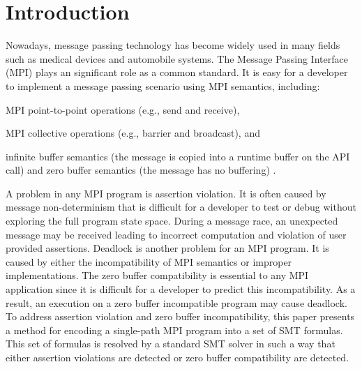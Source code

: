 \section{Introduction}
Nowadays, message passing technology has become widely used in many fields such as medical devices and automobile systems. The Message Passing Interface (MPI) plays an significant role as a common standard. It is easy for a developer to implement a message passing scenario using MPI semantics, including:

\begin{compactitem}
\item MPI point-to-point operations (e.g., send and receive),
\item MPI collective operations (e.g., barrier and broadcast), and
\item infinite buffer semantics (the message is copied into a runtime buffer on the API call) and zero buffer semantics (the message has no buffering) \cite{DBLP:conf/fm/VakkalankaVGK09}.
\end{compactitem}

A problem in any MPI program is assertion violation. It is often caused by message non-determinism that is difficult for a developer to test or debug without exploring the full program state space. During a message race, an unexpected message may be received leading to incorrect computation and violation of user provided assertions. Deadlock is another problem for an MPI program. It is caused by either the incompatibility of MPI semantics or improper implementations. The zero buffer compatibility is essential to any MPI application since it is difficult for a developer to predict this incompatibility. As a result, an execution on a zero buffer incompatible program may cause deadlock. To address assertion violation and zero buffer incompatibility, this paper presents a method for encoding a single-path MPI program into a set of SMT formulas. This set of formulas is resolved by a standard SMT solver in such a way that either assertion violations are detected or zero buffer compatibility are detected. 


